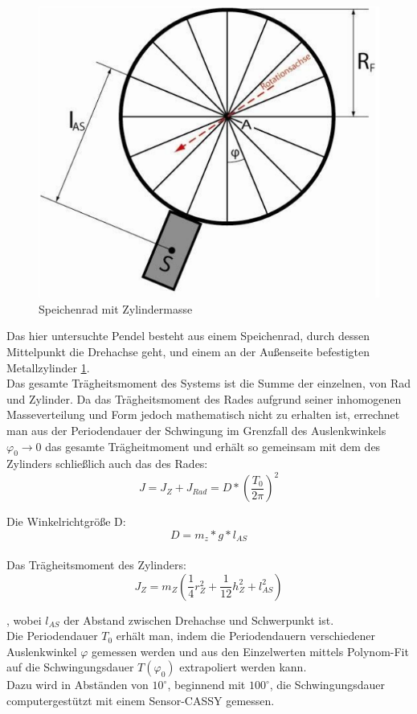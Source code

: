 \documentclass[12pt,a4paper]{article}
\begin{document}
\begin{multicols}{2}
\begin{itemize}
\begin{figure}[H]
	\centering
  	\includegraphics[scale=0.4]{./figure/speichenrad.png}
	\caption{Speichenrad mit Zylindermasse}
	\label{fig:rad}
\end{figure}

Das hier untersuchte Pendel besteht aus einem Speichenrad, durch dessen Mittelpunkt die Drehachse geht, und einem an der Außenseite befestigten Metallzylinder \ref{fig:rad}.\\
Das gesamte Trägheitsmoment des Systems ist die Summe der einzelnen, von Rad und Zylinder. Da das Trägheitsmoment des Rades aufgrund seiner inhomogenen Masseverteilung und Form jedoch mathematisch nicht zu erhalten ist, errechnet man aus der Periodendauer der Schwingung im Grenzfall des Auslenkwinkels $\varphi_{0} \rightarrow 0$ das gesamte Trägheitmoment und erhält so gemeinsam mit dem des Zylinders schließlich auch das des Rades:\\

$$ J = J_{Z} + J_{Rad} = D*(\frac{T_{0}}{2\pi})^2$$

Die Winkelrichtgröße D:\\

$$D=m_{z}*g*l_{AS}$$\\

Das Trägheitsmoment des Zylinders:\\

$$J_{Z}=m_{Z}(\frac{1}{4}r_{Z}^2 + \frac{1}{12}h_{Z}^2+l_{AS}^2)$$

, wobei $l_{AS}$ der Abstand zwischen Drehachse und Schwerpunkt ist.\\
Die Periodendauer $T_{0}$ erhält man, indem die Periodendauern verschiedener Auslenkwinkel $\varphi$ gemessen werden und aus den Einzelwerten mittels Polynom-Fit auf die Schwingungsdauer $T(\varphi_{0})$ extrapoliert werden kann.\\
Dazu wird in Abständen von $10^{\circ}$, beginnend mit $100^{\circ}$, die Schwingungsdauer computergestützt mit einem Sensor-CASSY gemessen.





\end{itemize}
\end{multicols}
\end{document}
